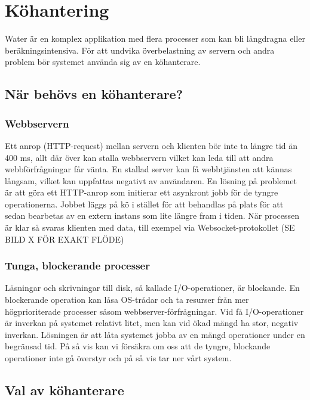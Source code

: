 \section{Köhantering}

Water är en komplex applikation med flera processer som kan bli långdragna eller beräkningsintensiva. För att undvika överbelastning av servern och andra problem bör systemet använda sig av en köhanterare.

\subsection{När behövs en köhanterare?}

\subsubsection{Webbservern}

Ett anrop (HTTP-request) mellan servern och klienten bör inte ta längre tid än 400 ms, allt där över kan stalla webbservern vilket kan leda till att andra webbförfrågningar får vänta. En stallad server kan få webbtjänsten att kännas långsam, vilket kan uppfattas negativt av användaren.
En lösning på problemet är att göra ett HTTP-anrop som initierar ett asynkront jobb för de tyngre operationerna. Jobbet läggs på kö i stället för att behandlas på plats för att sedan bearbetas av en extern instans som lite längre fram i tiden. När processen är klar så svaras klienten med data, till exempel via Websocket-protokollet (SE BILD X FÖR EXAKT FLÖDE)

\subsubsection{Tunga, blockerande processer}

Läsningar och skrivningar till disk, så kallade I/O-operationer, är blockande. En blockerande operation kan låsa OS-trådar och ta resurser från mer högprioriterade processer såsom webbserver-förfrågningar.
Vid få I/O-operationer är inverkan på systemet relativt litet, men kan vid ökad mängd ha stor, negativ inverkan.
Lösningen är att låta systemet jobba av en mängd operationer under en begränsad tid. På så vis kan vi försäkra om oss att de tyngre, blockande operationer inte gå överstyr och på så vis tar ner vårt system.

\subsection{Val av köhanterare}

